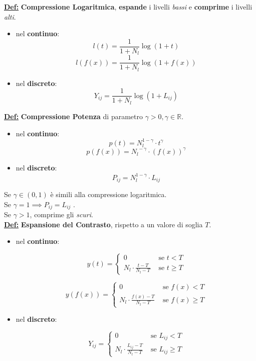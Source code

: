 \documentclass[a4paper,12pt]{article}
\newcommand{\definizione}{\noindent\textbf{\underline{Def:}} }
\begin{document}
	\definizione \textbf{Compressione Logaritmica}, \textbf{espande} i livelli \textit{bassi} e \textbf{comprime} i livelli \textit{alti}.

	\begin{itemize}
		\item nel \textbf{continuo}:
		\[
		l(t) = \frac{1}{1 + N_l} \log(1 + t)
		\]
		\[
		l(f(x)) = \frac{1}{1 + N_l} \log (1 + f(x))
		\]
		\item nel \textbf{discreto}:
		\[
		Y_{ij} = \frac{1}{1 + N_l} \log (1 + L_{ij})
		\]
	\end{itemize}

	\definizione \textbf{Compressione Potenza} di parametro $\gamma > 0, \gamma \in \mathbb{R}$.

	\begin{itemize}
		\item nel \textbf{continuo}:
		\[
		p(t) = N_l^{1 - \gamma} \cdot t^\gamma
		\]
		\[
		p(f(x)) = N_l^{\ - \gamma} \cdot (f(x))^\gamma
		\]
		\item nel \textbf{discreto}:
		\[
		P_{ij} = N_l^{1 - \gamma} \cdot L_{ij}
		\]
	\end{itemize}
	Se $\gamma  \in (0,1)$ è simili alla compressione logaritmica.\\
	Se $\gamma = 1 \implies P_{ij} = L_{ij}$ .\\
	Se $\gamma > 1 $, comprime gli \textit{scuri}. \\

	\definizione \textbf{Espansione del Contrasto}, rispetto a un valore di soglia $T$.

	\begin{itemize}
		\item nel \textbf{continuo}:

		\[
		y(t) = \begin{cases}
			0 & \text{ se } t < T \\
			N_l \cdot \frac{t - T}{N_l - T} & \text{ se } t \geq T
		\end{cases}
		\]

		\[
		y(f(x)) = \begin{cases}
			0 & \text{ se } f(x) < T \\
			N_l \cdot \frac{f(x) - T}{N_l - T} & \text{ se } f(x) \geq T
		\end{cases}
		\]
		\item nel \textbf{discreto}:

		\[
		Y_{ij} = \begin{cases}
			0 & \text{ se } L_{ij} < T \\
			N_l \cdot \frac{L_{ij} - T}{N_l - T} & \text{ se } L_{ij} \geq T
		\end{cases}
		\]
	\end{itemize}
\end{document}
